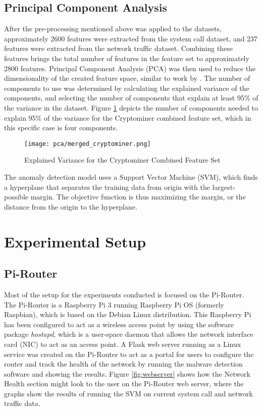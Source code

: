 \documentclass[runningheads]{llncs}
\begin{document}
\subsection{Principal Component Analysis}
After the pre-processing mentioned above was applied to the datasets, approximately 2600 features were extracted from the system call dataset, and 237 features were extracted from the network traffic dataset. Combining these features brings the total number of features in the feature set to approximately 2800 features. Principal Component Analysis (PCA) was then used to reduce the dimensionality of the created feature space, similar to work by \cite{MALWARE19}. The number of components to use was determined by calculating the explained variance of the components, and selecting the number of components that explain at least 95\% of the variance in the dataset. Figure \ref{fig:pca} depicts the number of components needed to explain 95\% of the variance for the Cryptominer combined feature set, which in this specific case is four components.

\begin{figure}
    \centering
    \texttt{[image: pca/merged\_cryptominer.png]}
    \caption{Explained Variance for the Cryptominer Combined Feature Set\label{fig:pca}}
\end{figure}

The anomaly detection model uses a  Support Vector Machine (SVM), which finds a hyperplane that separates the training data from origin with the largest-possible margin. The objective function is thus maximizing the margin, or the distance from the origin to the hyperplane. 

\section{Experimental Setup}
\subsection{Pi-Router}
Most of the setup for the experiments conducted is focused on the Pi-Router. The Pi-Router is a Raspberry Pi 3 running Raspberry Pi OS (formerly Raspbian), which is based on the Debian Linux distribution. This Raspberry Pi has been configured to act as a wireless access point by using the software package \textit{hostapd}, which is a user-space daemon that allows the network interface card (NIC) to act as an access point. A Flask web server running as a Linux service was created on the Pi-Router to act as a portal for users to configure the router and track the health of the network by running the malware detection software and showing the results. Figure \ref{fig:webserver} shows how the Network Health section might look to the user on the Pi-Router web server, where the graphs show the results of running the SVM on current system call and network traffic data. 
\end{document}
